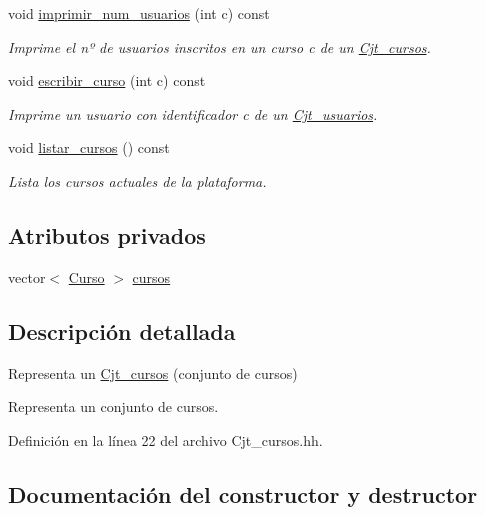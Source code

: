 \begin{DoxyCompactItemize}
void \mbox{\hyperlink{class_cjt__cursos_a7d5981081ad5aeaa73bdd88b4a7f66c9}{imprimir\+\_\+num\+\_\+usuarios}} (int c) const
\begin{DoxyCompactList}\small\item\em Imprime el nº de usuarios inscritos en un curso c de un \mbox{\hyperlink{class_cjt__cursos}{Cjt\+\_\+cursos}}. \end{DoxyCompactList}\item 
void \mbox{\hyperlink{class_cjt__cursos_a6c98d2f0a31253b84dc8b4a0ea48c348}{escribir\+\_\+curso}} (int c) const
\begin{DoxyCompactList}\small\item\em Imprime un usuario con identificador c de un \mbox{\hyperlink{class_cjt__usuarios}{Cjt\+\_\+usuarios}}. \end{DoxyCompactList}\item 
void \mbox{\hyperlink{class_cjt__cursos_abba27f9593cae77bf02909a06454ec43}{listar\+\_\+cursos}} () const
\begin{DoxyCompactList}\small\item\em Lista los cursos actuales de la plataforma. \end{DoxyCompactList}\end{DoxyCompactItemize}
\subsection*{Atributos privados}
\begin{DoxyCompactItemize}
\item 
vector$<$ \mbox{\hyperlink{class_curso}{Curso}} $>$ \mbox{\hyperlink{class_cjt__cursos_a582f9540bc295212450dba4cd18c8886}{cursos}}
\end{DoxyCompactItemize}


\subsection{Descripción detallada}
Representa un \mbox{\hyperlink{class_cjt__cursos}{Cjt\+\_\+cursos}} (conjunto de cursos) 

Representa un conjunto de cursos. 

Definición en la línea 22 del archivo Cjt\+\_\+cursos.\+hh.



\subsection{Documentación del constructor y destructor}
\mbox{\label{class_cjt__cursos_acabe06047f0b2a3093dc75c8a70a4dd2}} 
